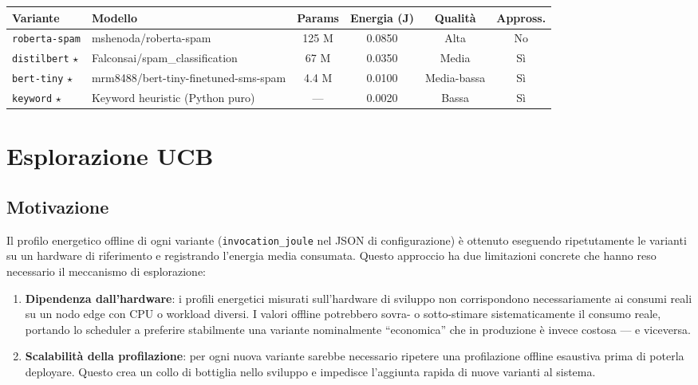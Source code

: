 \documentclass[a4paper,11pt]{article}
\begin{document}
\begin{table}[h!]
\centering
\footnotesize
\setlength{\tabcolsep}{4pt}
\begin{tabular}{p{2.2cm}p{6.0cm}cccc}
\toprule
\textbf{Variante} & \textbf{Modello} & \textbf{Params} &
\textbf{Energia (J)} & \textbf{Qualità} & \textbf{Appross.} \\
\midrule
\texttt{roberta-spam}  & mshenoda/roberta-spam                         & 125 M & 0.0850 & Alta        & No \\
\texttt{distilbert} $\star$ & Falconsai/spam\_classification            &  67 M & 0.0350 & Media       & Sì \\
\texttt{bert-tiny}  $\star$ & mrm8488/bert-tiny-finetuned-sms-spam     & 4.4 M & 0.0100 & Media-bassa & Sì \\
\texttt{keyword}    $\star$ & Keyword heuristic (Python puro)           &  ---  & 0.0020 & Bassa       & Sì \\
\bottomrule
\end{tabular}
\end{table}

\section{Esplorazione UCB}

\subsection{Motivazione}

Il profilo energetico offline di ogni variante (\texttt{invocation\_joule} nel JSON di
configurazione) è ottenuto eseguendo ripetutamente le varianti su un hardware di
riferimento e registrando l'energia media consumata.
Questo approccio ha due limitazioni concrete che hanno reso necessario il meccanismo
di esplorazione:

\begin{enumerate}
  \item \textbf{Dipendenza dall'hardware}: i profili energetici misurati sull'hardware
    di sviluppo non corrispondono necessariamente ai consumi reali su un nodo edge con
    CPU o workload diversi. I valori offline potrebbero sovra- o sotto-stimare
    sistematicamente il consumo reale, portando lo scheduler a preferire stabilmente
    una variante nominalmente ``economica'' che in produzione è invece costosa --- e
    viceversa.

  \item \textbf{Scalabilità della profilazione}: per ogni nuova variante sarebbe
    necessario ripetere una profilazione offline esaustiva prima di poterla deployare.
    Questo crea un collo di bottiglia nello sviluppo e impedisce l'aggiunta rapida di
    nuove varianti al sistema.
\end{enumerate}
\end{document}
